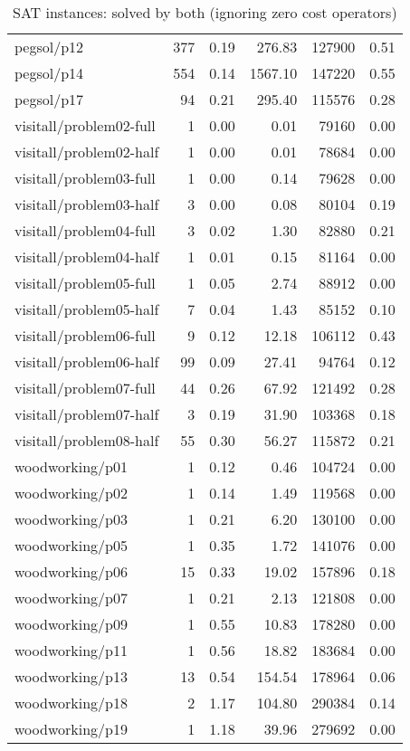 \begin{table*}[htbp]
\begin{tabular}{lrrrrr}
  pegsol/p12 & 377 & 0.19 & 276.83 & 127900 & 0.51 \\ 
  pegsol/p14 & 554 & 0.14 & 1567.10 & 147220 & 0.55 \\ 
  pegsol/p17 &  94 & 0.21 & 295.40 & 115576 & 0.28 \\ 
  visitall/problem02-full &   1 & 0.00 & 0.01 & 79160 & 0.00 \\ 
  visitall/problem02-half &   1 & 0.00 & 0.01 & 78684 & 0.00 \\ 
  visitall/problem03-full &   1 & 0.00 & 0.14 & 79628 & 0.00 \\ 
  visitall/problem03-half &   3 & 0.00 & 0.08 & 80104 & 0.19 \\ 
  visitall/problem04-full &   3 & 0.02 & 1.30 & 82880 & 0.21 \\ 
  visitall/problem04-half &   1 & 0.01 & 0.15 & 81164 & 0.00 \\ 
  visitall/problem05-full &   1 & 0.05 & 2.74 & 88912 & 0.00 \\ 
  visitall/problem05-half &   7 & 0.04 & 1.43 & 85152 & 0.10 \\ 
  visitall/problem06-full &   9 & 0.12 & 12.18 & 106112 & 0.43 \\ 
  visitall/problem06-half &  99 & 0.09 & 27.41 & 94764 & 0.12 \\ 
  visitall/problem07-full &  44 & 0.26 & 67.92 & 121492 & 0.28 \\ 
  visitall/problem07-half &   3 & 0.19 & 31.90 & 103368 & 0.18 \\ 
  visitall/problem08-half &  55 & 0.30 & 56.27 & 115872 & 0.21 \\ 
  woodworking/p01 &   1 & 0.12 & 0.46 & 104724 & 0.00 \\ 
  woodworking/p02 &   1 & 0.14 & 1.49 & 119568 & 0.00 \\ 
  woodworking/p03 &   1 & 0.21 & 6.20 & 130100 & 0.00 \\ 
  woodworking/p05 &   1 & 0.35 & 1.72 & 141076 & 0.00 \\ 
  woodworking/p06 &  15 & 0.33 & 19.02 & 157896 & 0.18 \\ 
  woodworking/p07 &   1 & 0.21 & 2.13 & 121808 & 0.00 \\ 
  woodworking/p09 &   1 & 0.55 & 10.83 & 178280 & 0.00 \\ 
  woodworking/p11 &   1 & 0.56 & 18.82 & 183684 & 0.00 \\ 
  woodworking/p13 &  13 & 0.54 & 154.54 & 178964 & 0.06 \\ 
  woodworking/p18 &   2 & 1.17 & 104.80 & 290384 & 0.14 \\ 
  woodworking/p19 &   1 & 1.18 & 39.96 & 279692 & 0.00 \\ 
   \hline
\end{tabular}
\endgroup
\caption{SAT instances: solved by both (ignoring zero cost operators)} 
\label{tab:sat_both}
\end{table*}
